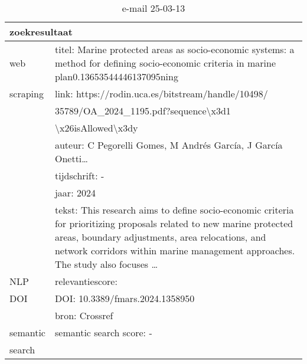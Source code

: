 \begin{table}[h!]
    \caption{e-mail 25-03-13}
    \centering
    \begin{tabularx}{\textwidth}{|p{4cm}|X|} 
        \hline
        \multicolumn{2}{|X|}{\textbf{zoekresultaat}} \\
        \hline
        web &titel: Marine protected areas as socio-economic systems: a method for defining socio-economic criteria in marine plan0.13653544446137095ning\\
        scraping&link: https://rodin.uca.es/bitstream/handle/10498/\\&35789/OA_2024_1195.pdf?sequence\textbackslash x3d1\\&\textbackslash x26isAllowed\textbackslash x3dy\\
        &auteur: C Pegorelli Gomes, M Andrés García, J García Onetti…\\
        &tijdschrift: -\\
        &jaar: 2024\\
        &tekst: This research aims to define socio-economic criteria for prioritizing proposals related to new marine protected areas, boundary adjustments, area relocations, and network corridors within marine management approaches. The study also focuses …\\
        \hline
        NLP&relevantiescore: \\
        \hline
        DOI&DOI: 10.3389/fmars.2024.1358950\\
        &bron: Crossref\\
        \hline
        semantic&semantic search score: -\\
        search&\\
        \hline
    \end{tabularx}
    \label{table:email20250313}
\end{table}
